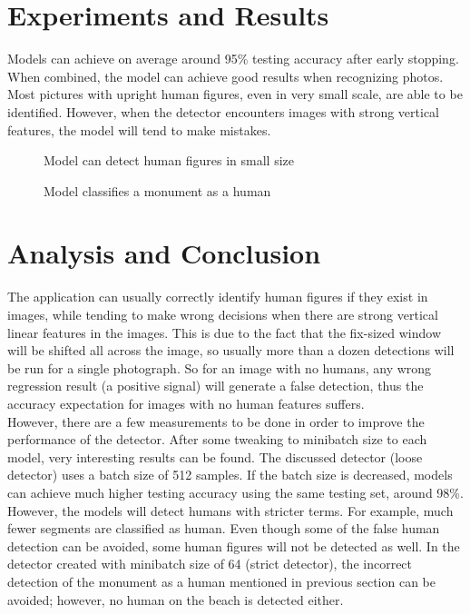 \documentclass[twocolumn, 12pt]{article}
\begin{document}
\section{Experiments and Results}
Models can achieve on average around 95\% testing accuracy after early stopping. When combined, the model can achieve good results when recognizing photos. Most pictures with upright human figures, even in very small scale, are able to be identified. However, when the detector encounters images with strong vertical features, the model will tend to make mistakes. 
 \begin{figure}[!h]
        \caption{\label{fig:Correct Detection} Model can detect human figures in small size}
      \end{figure}
      
\begin{figure}[H]
        \caption{\label{fig:Incorrect Detection} Model classifies a monument as a human}
      \end{figure}
 
\section{Analysis and Conclusion}
The application can usually correctly identify human figures if they exist in images, while tending to make wrong decisions when there are strong vertical linear features in the images. This is due to the fact that the fix-sized window will be shifted all across the image, so usually more than a dozen detections will be run for a single photograph. So for an image with no humans, any wrong regression result (a positive signal) will generate a false detection, thus the accuracy expectation for images with no human features suffers. \\

However, there are a few measurements to be done in order to improve the performance of the detector. After some tweaking to minibatch size to each model, very interesting results can be found. The discussed detector (loose detector) uses a batch size of 512 samples. If the batch size is decreased, models can achieve much higher testing accuracy using the same testing set, around 98\%. However, the models will detect humans with stricter terms. For example, much fewer segments are classified as human. Even though some of the false human detection can be avoided, some human figures will not be detected as well. In the detector created with minibatch size of 64 (strict detector), the incorrect detection of the monument as a human mentioned in previous section can be avoided; however, no human on the beach is detected either.
\end{document}
